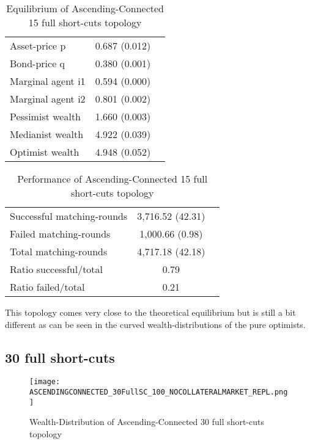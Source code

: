 \documentclass[Bachelorarbeit.tex]{subfiles}
\begin{document}
\begin{table}[H]
	\caption{Equilibrium of Ascending-Connected 15 full short-cuts topology}
	\centering
	\begin{tabular} { l c r }
		\hline
		Asset-price p & 0.687 (0.012) \\
		Bond-price q & 0.380 (0.001) \\
		Marginal agent i1 & 0.594 (0.000) \\
		Marginal agent i2 & 0.801 (0.002) \\
		\hline
		Pessimist wealth & 1.660 (0.003) \\
		Medianist wealth & 4.922 (0.039) \\
		Optimist wealth & 4.948 (0.052) \\
		\hline
	\end{tabular}
\end{table} 

\begin{table}[H]
	\caption{Performance of Ascending-Connected 15 full short-cuts topology}
	\centering
	\begin{tabular} { l c r }
		\hline
		Successful matching-rounds & 3,716.52 (42.31) \\
		Failed matching-rounds & 1,000.66 (0.98) \\
		Total matching-rounds & 4,717.18 (42.18) \\
		\hline
		Ratio successful/total & 0.79 \\
		Ratio failed/total & 0.21 \\
		\hline
	\end{tabular}
\end{table}

This topology comes very close to the theoretical equilibrium but is still a bit different as can be seen in the curved wealth-distributions of the pure optimists.

\subsection{30 full short-cuts}
\begin{figure}[H]
	\centering
  \texttt{[image: ASCENDINGCONNECTED\_30FullSC\_100\_NOCOLLATERALMARKET\_REPL.png]}
	\caption{Wealth-Distribution of Ascending-Connected 30 full short-cuts topology}
	\label{fig:wealth_ASCENDINGCONNECTED_30FullSC_100_NOCOLLATERALMARKET_REPL}
\end{figure}
\end{document}
